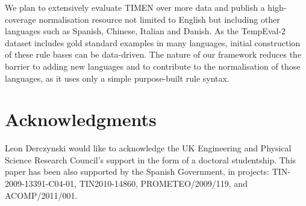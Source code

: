\documentclass[10pt, a4paper]{article}
\begin{document}
We plan to extensively evaluate TIMEN over more data and publish a high-coverage normalisation resource not limited to English but including other languages such as Spanish, Chinese, Italian and Danish. As the TempEval-2 dataset includes gold standard examples in many languages, initial construction of these rule bases can be data-driven. The nature of our framework reduces the barrier to adding new languages and to contribute to the normalisation of those languages, as it uses only a simple purpose-built rule syntax.


\section*{Acknowledgments}
Leon Derczynski would like to acknowledge the UK Engineering and Physical Science Research Council's support in the form of a doctoral studentship.
This paper has been also supported by the Spanish Government, in projects: {\scriptsize TIN-2009-13391-C04-01}, {\scriptsize TIN2010-14860}, {\scriptsize PROMETEO/2009/119}, and {\scriptsize ACOMP/2011/001}.




 
\end{document}
